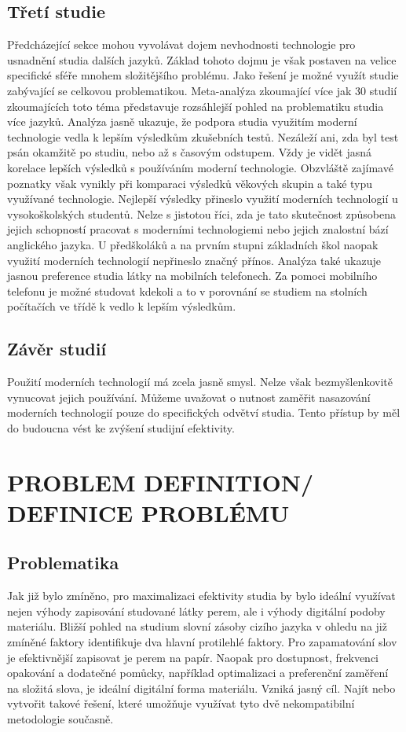 \documentclass[journal]{IEEEtran}
\begin{document}
\subsection{Třetí studie}
Předcházející sekce mohou vyvolávat dojem nevhodnosti technologie pro usnadnění studia dalších jazyků.
Základ tohoto dojmu je však postaven na velice specifické sféře mnohem složitějšího problému.
Jako řešení je možné využít studie zabývající se celkovou problematikou.
Meta-analýza zkoumající více jak 30 studií zkoumajících toto téma představuje rozsáhlejší pohled na problematiku studia více jazyků.\cite{technology_vocab} Analýza jasně ukazuje, že podpora studia využitím moderní technologie vedla k lepším výsledkům zkušebních testů.
Nezáleží ani, zda byl test psán okamžitě po studiu, nebo až s časovým odstupem.
Vždy je vidět jasná korelace lepších výsledků s používáním moderní technologie.
Obzvláště zajímavé poznatky však vynikly při komparaci výsledků věkových skupin a také typu využívané technologie.
Nejlepší výsledky přineslo využití moderních technologií u vysokoškolských studentů.
Nelze s jistotou říci, zda je tato skutečnost způsobena jejich schopností pracovat s moderními technologiemi nebo jejich znalostní bází anglického jazyka.
U předškoláků a na prvním stupni základních škol naopak využití moderních technologií nepřineslo značný přínos.
Analýza také ukazuje jasnou preference studia látky na mobilních telefonech.
Za pomoci mobilního telefonu je možné studovat kdekoli a to v porovnání se studiem na stolních počítačích ve třídě k vedlo k lepším výsledkům.

\subsection{Závěr studií}
Použití moderních technologií má zcela jasně smysl.
Nelze však bezmyšlenkovitě vynucovat jejich používání.
Můžeme uvažovat o nutnost zaměřit nasazování moderních technologií pouze do specifických odvětví studia.
Tento přístup by měl do budoucna vést ke zvýšení studijní efektivity.

\section{PROBLEM DEFINITION/ DEFINICE PROBLÉMU}

\subsection{Problematika}
Jak již bylo zmíněno, pro maximalizaci efektivity studia by bylo ideální využívat nejen výhody zapisování studované látky perem, ale i výhody digitální podoby materiálu.
Bližší pohled na studium slovní zásoby cizího jazyka v ohledu na již zmíněné faktory identifikuje dva hlavní protilehlé faktory.
Pro zapamatování slov je efektivnější zapisovat je perem na papír.
Naopak pro dostupnost, frekvenci opakování a dodatečné pomůcky, například optimalizaci a preferenční zaměření na složitá slova, je ideální digitální forma materiálu.
Vzniká jasný cíl.
Najít nebo vytvořit takové řešení, které umožňuje využívat tyto dvě nekompatibilní metodologie současně.
\end{document}
